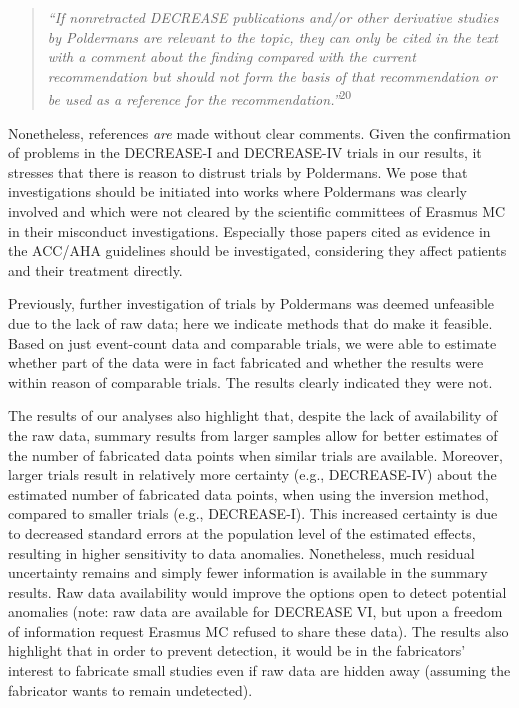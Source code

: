 \documentclass[]{article}
\begin{document}
\begin{quote}
\emph{``If nonretracted DECREASE publications and/or other derivative
studies by Poldermans are relevant to the topic, they can only be cited
in the text with a comment about the finding compared with the current
recommendation but should not form the basis of that recommendation or
be used as a reference for the recommendation.''}\textsuperscript{20}
\end{quote}

Nonetheless, references \emph{are} made without clear comments. Given
the confirmation of problems in the DECREASE-I and DECREASE-IV trials in
our results, it stresses that there is reason to distrust trials by
Poldermans. We pose that investigations should be initiated into works
where Poldermans was clearly involved and which were not cleared by the
scientific committees of Erasmus MC in their misconduct investigations.
Especially those papers cited as evidence in the ACC/AHA guidelines
should be investigated, considering they affect patients and their
treatment directly.

Previously, further investigation of trials by Poldermans was deemed
unfeasible due to the lack of raw data; here we indicate methods that do
make it feasible. Based on just event-count data and comparable trials,
we were able to estimate whether part of the data were in fact
fabricated and whether the results were within reason of comparable
trials. The results clearly indicated they were not.

The results of our analyses also highlight that, despite the lack of
availability of the raw data, summary results from larger samples allow
for better estimates of the number of fabricated data points when
similar trials are available. Moreover, larger trials result in
relatively more certainty (e.g., DECREASE-IV) about the estimated number
of fabricated data points, when using the inversion method, compared to
smaller trials (e.g., DECREASE-I). This increased certainty is due to
decreased standard errors at the population level of the estimated
effects, resulting in higher sensitivity to data anomalies. Nonetheless,
much residual uncertainty remains and simply fewer information is
available in the summary results. Raw data availability would improve
the options open to detect potential anomalies (note: raw data are
available for DECREASE VI, but upon a freedom of information request
Erasmus MC refused to share these data). The results also highlight that
in order to prevent detection, it would be in the fabricators' interest
to fabricate small studies even if raw data are hidden away (assuming
the fabricator wants to remain undetected).
\end{document}
